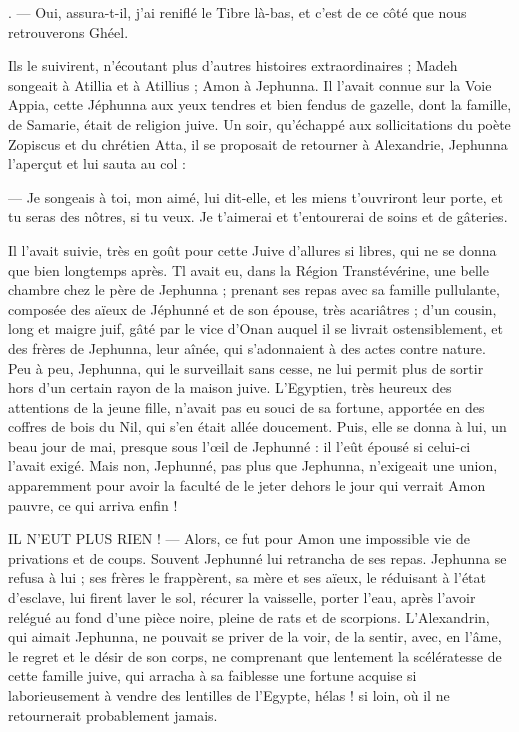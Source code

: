\documentclass[a4paper, 11pt, oneside, polutonikogreek, french]{article}
\begin{document}
. --- Oui, assura-t-il, j'ai reniflé le Tibre là-bas, et c'est de ce côté que nous retrouverons Ghéel.

Ils le suivirent, n'écoutant plus d'autres histoires extraordinaires ; Madeh songeait à Atillia et à Atillius ; Amon à Jephunna. Il l'avait connue sur la Voie Appia, cette Jéphunna aux yeux tendres et bien fendus de gazelle, dont la famille, de Samarie, était de religion juive. Un soir, qu'échappé aux sollicitations du poète Zopiscus et du chrétien Atta, il se proposait de retourner à Alexandrie, Jephunna l'aperçut et lui sauta au col :

--- Je songeais à toi, mon aimé, lui dit-elle, et les miens t'ouvriront leur porte, et tu seras des nôtres, si tu veux. Je t'aimerai et t’entourerai de soins et de gâteries.

Il l'avait suivie, très en goût pour cette Juive d'allures si libres, qui ne se donna que bien longtemps après. Tl avait eu, dans la Région Transtévérine, une belle chambre chez le père de Jephunna ; prenant ses repas avec sa famille pullulante, composée des aïeux de Jéphunné et de son épouse, très acariâtres ; d'un cousin, long et maigre juif, gâté par le vice d'Onan auquel il se livrait ostensiblement, et des frères de Jephunna, leur aînée, qui s'adonnaient à des actes contre nature. Peu à peu, Jephunna, qui le surveillait sans cesse, ne lui permit plus de sortir hors d'un certain rayon de la maison juive. L'Egyptien, très heureux des attentions de la jeune fille, n'avait pas eu souci de sa fortune, apportée en des coffres de bois du Nil, qui s'en était allée doucement. Puis, elle se donna à lui, un beau jour de mai, presque sous l'œil de Jephunné : il l'eût épousé si celui-ci l'avait exigé. Mais non, Jephunné, pas plus que Jephunna, n'exigeait une union, apparemment pour avoir la faculté de le jeter dehors le jour qui verrait Amon pauvre, ce qui arriva enfin !

IL N’EUT PLUS RIEN ! --- Alors, ce fut pour Amon une impossible vie de privations et de coups. Souvent Jephunné lui retrancha de ses repas. Jephunna se refusa à lui ; ses frères le frappèrent, sa mère et ses aïeux, le réduisant à l'état d'esclave, lui firent laver le sol, récurer la vaisselle, porter l'eau, après l'avoir relégué au fond d'une pièce noire, pleine de rats et de scorpions. L'Alexandrin, qui aimait Jephunna, ne pouvait se priver de la voir, de la sentir, avec, en l'âme, le regret et le désir de son corps, ne comprenant que lentement la scélératesse de cette famille juive, qui arracha à sa faiblesse une fortune acquise si laborieusement à vendre des lentilles de l'Egypte, hélas ! si loin, où il ne retournerait probablement jamais.
\end{document}
